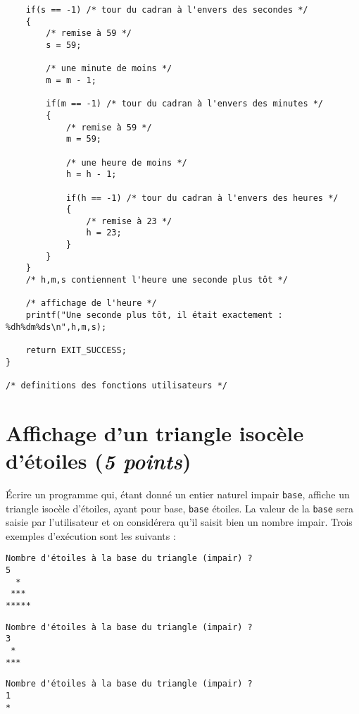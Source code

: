 \begin{enumerate}
\begin{correction}
\begin{small}
\begin{verbatim}
    if(s == -1) /* tour du cadran à l'envers des secondes */
    {
        /* remise à 59 */
        s = 59;

        /* une minute de moins */
        m = m - 1;

        if(m == -1) /* tour du cadran à l'envers des minutes */
        {
            /* remise à 59 */
            m = 59;

            /* une heure de moins */
            h = h - 1;

            if(h == -1) /* tour du cadran à l'envers des heures */
            {
                /* remise à 23 */
                h = 23;
            }
        }
    }
    /* h,m,s contiennent l'heure une seconde plus tôt */

    /* affichage de l'heure */
    printf("Une seconde plus tôt, il était exactement : %dh%dm%ds\n",h,m,s);

    return EXIT_SUCCESS;
}

/* definitions des fonctions utilisateurs */

\end{verbatim}
\end{small}
  \end{correction}
\end{enumerate}

\section{Affichage d'un triangle isocèle d'étoiles (\textit{5 points})}

Écrire un programme qui, étant donné un entier naturel impair \verb|base|, affiche un triangle isocèle d'étoiles, ayant pour base, \verb|base| étoiles. La valeur de la \verb|base| sera saisie par l'utilisateur et on considérera qu'il saisit bien un nombre impair. Trois exemples d'exécution sont les suivants :
\begin{small}
\begin{verbatim}
Nombre d'étoiles à la base du triangle (impair) ?
5
  *
 ***
*****
\end{verbatim}
\end{small}
\begin{small}
\begin{verbatim}
Nombre d'étoiles à la base du triangle (impair) ?
3
 *
***
\end{verbatim}
\end{small}
\begin{small}
\begin{verbatim}
Nombre d'étoiles à la base du triangle (impair) ?
1
*
\end{verbatim}
\end{small}

